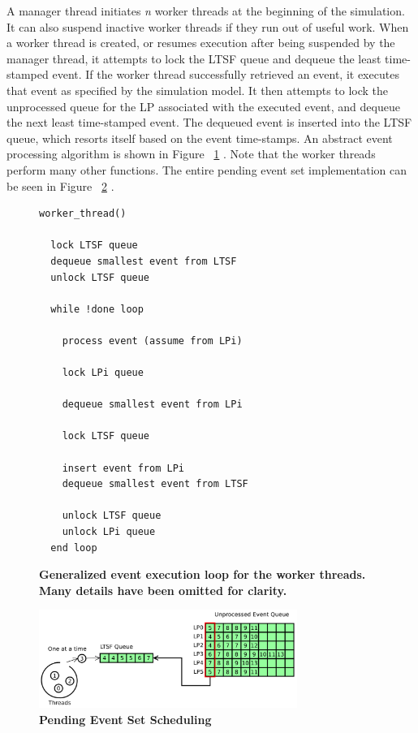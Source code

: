 \documentclass[11pt]{book}
\begin{document}
A manager thread initiates \emph{n} worker threads at the beginning of the simulation.
It can also suspend inactive worker threads if they run out of useful work.  When a worker
thread is created, or resumes execution after being suspended by the manager thread, it
attempts to lock the LTSF queue and dequeue the least time-stamped event.  If the worker
thread successfully retrieved an event, it executes that event as specified by the
simulation model.  It then attempts to lock the unprocessed queue for the LP associated
with the executed event, and dequeue the next least time-stamped event.  The dequeued
event is inserted into the LTSF queue, which resorts itself based on the event
time-stamps.  An abstract event processing algorithm is shown in Figure
~\ref{workerThreadAlgorithm} \cite{dickman}.  Note that the worker threads perform many
other functions.  The entire pending event set implementation can be seen in Figure
~\ref{fig:singleLTSFqueue} \cite{dickman}.

\linespread{1.0}
\begin{figure}
\begin{verbatim}
worker_thread()

  lock LTSF queue
  dequeue smallest event from LTSF
  unlock LTSF queue

  while !done loop

    process event (assume from LPi)

    lock LPi queue 

    dequeue smallest event from LPi

    lock LTSF queue

    insert event from LPi
    dequeue smallest event from LTSF

    unlock LTSF queue
    unlock LPi queue
  end loop
\end{verbatim}
\caption{\textbf{Generalized event execution loop for the worker threads.  Many details
    have been omitted for clarity.}}\label{workerThreadAlgorithm}
\end{figure}

\begin{figure}[H]
    \centering
    \graphicspath{ {./figures/} }
    \includegraphics[width=0.75\textwidth,keepaspectratio]{single_ltsf_queue}
    \caption{\textbf{Pending Event Set Scheduling}}
    \label{fig:singleLTSFqueue}
\end{figure}
\end{document}

